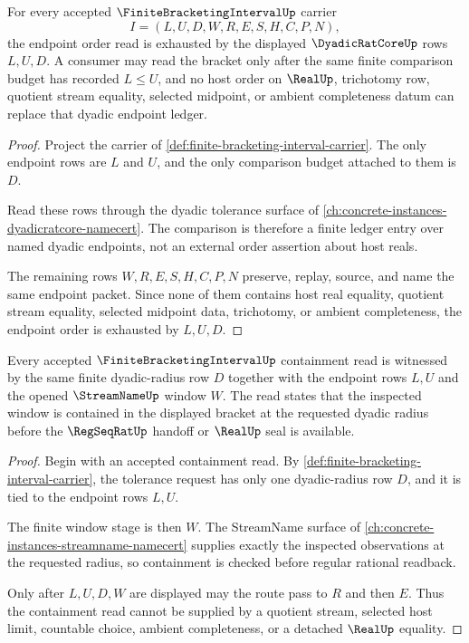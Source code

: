 \begin{theorem}
\label{thm:finite-bracketing-interval-endpoint-order}
For every accepted $\FiniteBracketingIntervalUp$ carrier
$$
I=(L,U,D,W,R,E,S,H,C,P,N),
$$
the endpoint order read is exhausted by the displayed $\DyadicRatCoreUp$ rows $L,U,D$. A consumer may read the bracket only after the same finite comparison budget has recorded $L \leq U$, and no host order on $\RealUp$, trichotomy row, quotient stream equality, selected midpoint, or ambient completeness datum can replace that dyadic endpoint ledger.
\end{theorem}
\begin{proof}
Project the carrier of \autoref{def:finite-bracketing-interval-carrier}. The only endpoint rows are $L$ and $U$, and the only comparison budget attached to them is $D$.

Read these rows through the dyadic tolerance surface of \autoref{ch:concrete-instances-dyadicratcore-namecert}. The comparison is therefore a finite ledger entry over named dyadic endpoints, not an external order assertion about host reals.

The remaining rows $W,R,E,S,H,C,P,N$ preserve, replay, source, and name the same endpoint packet. Since none of them contains host real equality, quotient stream equality, selected midpoint data, trichotomy, or ambient completeness, the endpoint order is exhausted by $L,U,D$.
\end{proof}

\begin{theorem}
\label{thm:finite-bracketing-interval-dyadic-radius-containment}
Every accepted $\FiniteBracketingIntervalUp$ containment read is witnessed by the same finite dyadic-radius row $D$ together with the endpoint rows $L,U$ and the opened $\StreamNameUp$ window $W$. The read states that the inspected window is contained in the displayed bracket at the requested dyadic radius before the $\RegSeqRatUp$ handoff or $\RealUp$ seal is available.
\end{theorem}
\begin{proof}
Begin with an accepted containment read. By \autoref{def:finite-bracketing-interval-carrier}, the tolerance request has only one dyadic-radius row $D$, and it is tied to the endpoint rows $L,U$.

The finite window stage is then $W$. The StreamName surface of \autoref{ch:concrete-instances-streamname-namecert} supplies exactly the inspected observations at the requested radius, so containment is checked before regular rational readback.

Only after $L,U,D,W$ are displayed may the route pass to $R$ and then $E$. Thus the containment read cannot be supplied by a quotient stream, selected host limit, countable choice, ambient completeness, or a detached $\RealUp$ equality.
\end{proof}

